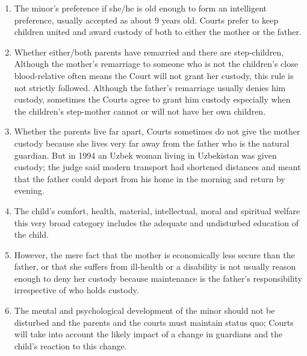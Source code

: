 \begin{multicols}{2}
\begin{enumerate}
\item The minor's preference if she/he is old enough to form an intelligent preference, usually
accepted as about 9 years old. Courts prefer to keep children united and award custody of
both to either the mother or the father.

\item Whether either/both parents have remarried and there are step-children, Although the
mother's remarriage to someone who is not the children's close blood-relative often means
the Court will not grant her custody, this rule is not strictly followed. Although the father's
remarriage usually denies him custody, sometimes the Courts agree to grant him custody
especially when the children's step-mother cannot or will not have her own children.

\item Whether the parents live far apart, Courts sometimes do not give the mother custody
because she lives very far away from the father who is the natural guardian. But in 1994
an Uzbek woman living in Uzbekistan was given custody; the judge said modern transport
had shortened distances and meant that the father could depart from his home in the
morning and return by evening.

\item The child's comfort, health, material, intellectual, moral and spiritual welfare this very
broad category includes the adequate and undisturbed education of the child.

\item However, the mere fact that the mother is economically less secure than the father, or that
she suffers from ill-health or a disability is not usually reason enough to deny her custody
because maintenance is the father's responsibility irrespective of who holds custody.

\item The mental and psychological development of the minor should not be disturbed and the
parents and the courts must maintain status quo; Courts will take into account the likely
impact of a change in guardians and the child's reaction to this change.
\end{enumerate}


\vspace{-.4cm}



\end{multicols}
